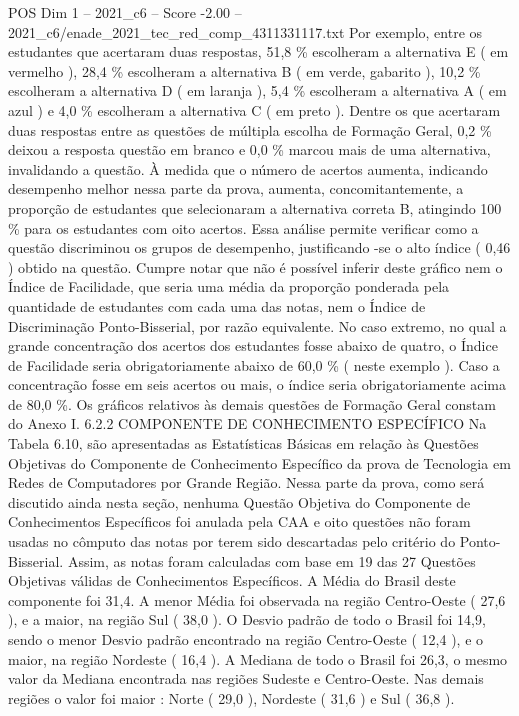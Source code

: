 \begin{textsample}{POS Dim 1 – 2021\_c6 – Score -2.00 – 2021\_c6/enade\_2021\_tec\_red\_comp\_4311331117.txt}
Por exemplo, entre os estudantes que acertaram duas respostas, 51,8 \% escolheram a alternativa E ( em vermelho ), 28,4 \% escolheram a alternativa B ( em verde, gabarito ), 10,2 \% escolheram a alternativa D ( em laranja ), 5,4 \% escolheram a alternativa A ( em azul ) e 4,0 \% escolheram a alternativa C ( em preto ).
Dentre os que acertaram duas respostas entre as questões de múltipla escolha de Formação Geral, 0,2 \% deixou a resposta questão em branco e 0,0 \% marcou mais de uma alternativa, invalidando a questão.
À medida que o número de acertos aumenta, indicando desempenho melhor nessa parte da prova, aumenta, concomitantemente, a proporção de estudantes que selecionaram a alternativa correta B, atingindo 100 \% para os estudantes com oito acertos.
Essa análise permite verificar como a questão discriminou os grupos de desempenho, justificando -se o alto índice ( 0,46 ) obtido na questão.
Cumpre notar que não é possível inferir deste gráfico nem o Índice de Facilidade, que seria uma média da proporção ponderada pela quantidade de estudantes com cada uma das notas, nem o Índice de Discriminação Ponto-Bisserial, por razão equivalente.
No caso extremo, no qual a grande concentração dos acertos dos estudantes fosse abaixo de quatro, o Índice de Facilidade seria obrigatoriamente abaixo de 60,0 \% ( neste exemplo ).
Caso a concentração fosse em seis acertos ou mais, o índice seria obrigatoriamente acima de 80,0 \%.
Os gráficos relativos às demais questões de Formação Geral constam do Anexo I. 6.2.2 COMPONENTE DE CONHECIMENTO ESPECÍFICO Na Tabela 6.10, são apresentadas as Estatísticas Básicas em relação às Questões Objetivas do Componente de Conhecimento Específico da prova de Tecnologia em Redes de Computadores por Grande Região.
Nessa parte da prova, como será discutido ainda nesta seção, nenhuma Questão Objetiva do Componente de Conhecimentos Específicos foi anulada pela CAA e oito questões não foram usadas no cômputo das notas por terem sido descartadas pelo critério do Ponto-Bisserial.
Assim, as notas foram calculadas com base em 19 das 27 Questões Objetivas válidas de Conhecimentos Específicos.
A Média do Brasil deste componente foi 31,4.
A menor Média foi observada na região Centro-Oeste ( 27,6 ), e a maior, na região Sul ( 38,0 ).
O Desvio padrão de todo o Brasil foi 14,9, sendo o menor Desvio padrão encontrado na região Centro-Oeste ( 12,4 ), e o maior, na região Nordeste ( 16,4 ).
A Mediana de todo o Brasil foi 26,3, o mesmo valor da Mediana encontrada nas regiões Sudeste e Centro-Oeste.
Nas demais regiões o valor foi maior : Norte ( 29,0 ), Nordeste ( 31,6 ) e Sul ( 36,8 ).

\end{textsample}
